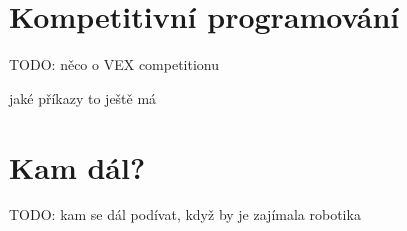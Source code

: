 \documentclass[../main.tex]{subfiles}
\begin{document}
	\section{Kompetitivní programování}
	TODO: něco o VEX competitionu

	jaké příkazy to ještě má

	\section{Kam dál?}
	TODO: kam se dál podívat, když by je zajímala robotika
\end{document}
